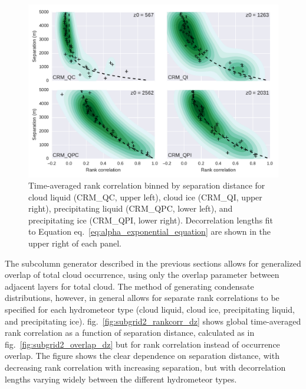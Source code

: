 \begin{figure}[htbp]
\centering
\includegraphics{graphics/subgrid2_rankcorr_dz.pdf}
\caption{\label{fig:subgrid2_rankcorr_dz}Time-averaged rank correlation
binned by separation distance for cloud liquid (CRM\_QC, upper left),
cloud ice (CRM\_QI, upper right), precipitating liquid (CRM\_QPC, lower
left), and precipitating ice (CRM\_QPI, lower right). Decorrelation
lengths fit to Equation eq.~\ref{eq:alpha_exponential_equation} are
shown in the upper right of each
panel.}\label{fig:subgrid2ux5frankcorrux5fdz}
\end{figure}

The subcolumn generator described in the previous sections allows for
generalized overlap of total cloud occurrence, using only the overlap
parameter between adjacent layers for total cloud. The method of
generating condensate distributions, however, in general allows for
separate rank correlations to be specified for each hydrometeor type
(cloud liquid, cloud ice, precipitating liquid, and precipitating ice).
fig.~\ref{fig:subgrid2_rankcorr_dz} shows global time-averaged rank
correlation as a function of separation distance, calculated as in
fig.~\ref{fig:subgrid2_overlap_dz} but for rank correlation instead of
occurrence overlap. The figure shows the clear dependence on separation
distance, with decreasing rank correlation with increasing separation,
but with decorrelation lengths varying widely between the different
hydrometeor types.

